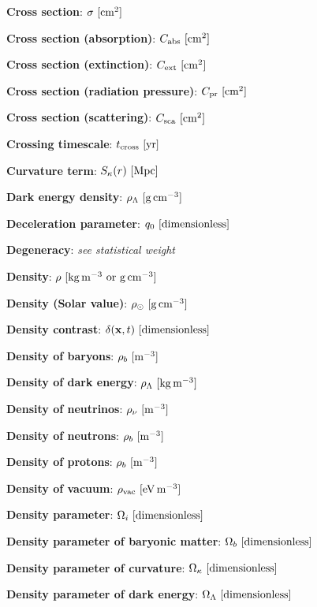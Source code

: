 \documentclass[a4paper,10pt]{article}
\begin{document}
{\noindent}\textbf{Cross section}: $\sigma ~ [{\rm cm^{2}}]$

{\noindent}\textbf{Cross section (absorption)}: $C_{\rm abs} ~ [{\rm cm^{2}}]$

{\noindent}\textbf{Cross section (extinction)}: $C_{\rm ext} ~ [{\rm cm^{2}}]$

{\noindent}\textbf{Cross section (radiation pressure)}: $C_{\rm pr} ~ [{\rm cm^{2}}]$

{\noindent}\textbf{Cross section (scattering)}: $C_{\rm sca} ~ [{\rm cm^{2}}]$

{\noindent}\textbf{Crossing timescale}: $t_\mathrm{cross} ~ [{\rm yr}]$

{\noindent}\textbf{Curvature term}: $S_\kappa(r) ~ [{\rm Mpc}]$

{\noindent}\textbf{Dark energy density}: $\rho_\Lambda ~ [{\rm g\,cm^{-3}}]$

{\noindent}\textbf{Deceleration parameter}: $q_0 ~ [{\rm dimensionless}]$

{\noindent}\textbf{Degeneracy}: \textit{see statistical weight}

{\noindent}\textbf{Density}: $\rho ~ [{\rm kg\,m^{-3}~{\rm or}~g\,cm^{-3}}]$

{\noindent}\textbf{Density (Solar value)}: $\rho_\odot ~ [{\rm g\,cm^{-3}}]$

{\noindent}\textbf{Density contrast}: $\delta(\mathbf{x},t) ~ [{\rm dimensionless}]$

{\noindent}\textbf{Density of baryons}: $\rho_b ~ [{\rm m^{-3}}]$

{\noindent}\textbf{Density of dark energy}: $\rho_\Lambda ~ [{\rm kg\,m^{-3}}]$

{\noindent}\textbf{Density of neutrinos}: $\rho_\nu ~ [{\rm m^{-3}}]$

{\noindent}\textbf{Density of neutrons}: $\rho_b ~ [{\rm m^{-3}}]$

{\noindent}\textbf{Density of protons}: $\rho_b ~ [{\rm m^{-3}}]$

{\noindent}\textbf{Density of vacuum}: $\rho_\mathrm{vac} ~ [{\rm eV\,m^{-3}}]$

{\noindent}\textbf{Density parameter}: $\Omega_i ~ [{\rm dimensionless}]$

{\noindent}\textbf{Density parameter of baryonic matter}: $\Omega_b ~
[{\rm dimensionless}]$

{\noindent}\textbf{Density parameter of curvature}: $\Omega_\kappa ~ [{\rm dimensionless}]$

{\noindent}\textbf{Density parameter of dark energy}: $\Omega_\Lambda ~ [{\rm dimensionless}]$
\end{document}
